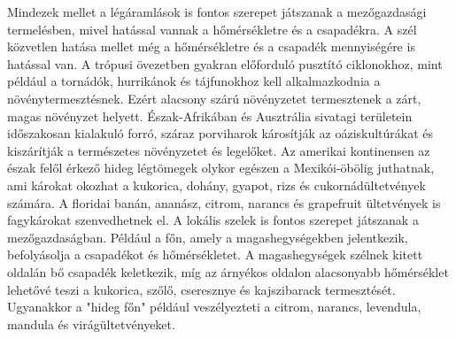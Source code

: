 \documentclass[a4paper,oneside,onecolumn,12pt]{LegrandOrangeBook}
\begin{document}
Mindezek mellet a légáramlások is fontos szerepet játszanak a mezőgazdasági termelésben, mivel hatással vannak a hőmérsékletre és a csapadékra. A szél közvetlen hatása mellet még a hőmérsékletre és a csapadék mennyiségére is hatással van. 
A trópusi övezetben gyakran előforduló pusztító ciklonokhoz, mint például a tornádók, hurrikánok és tájfunokhoz kell alkalmazkodnia a növénytermesztésnek. Ezért alacsony szárú növényzetet termesztenek a zárt, magas növényzet helyett.
	Észak-Afrikában és Ausztrália sivatagi területein időszakosan kialakuló forró, száraz porviharok károsítják az oáziskultúrákat és kiszárítják a természetes növényzetet és legelőket.
Az amerikai kontinensen az észak felől érkező hideg légtömegek olykor egészen a Mexikói-öbölig juthatnak, ami károkat okozhat a kukorica, dohány, gyapot, rizs és cukornádültetvények számára. A floridai banán, ananász, citrom, narancs és grapefruit ültetvények is fagykárokat szenvedhetnek el.
A lokális szelek is fontos szerepet játszanak a mezőgazdaságban. Például a főn, amely a magashegységekben jelentkezik, befolyásolja a csapadékot és hőmérsékletet. A magashegységek szélnek kitett oldalán bő csapadék keletkezik, míg az árnyékos oldalon alacsonyabb hőmérséklet lehetővé teszi a kukorica, szőlő, cseresznye és kajszibarack termesztését. Ugyanakkor a "hideg főn" például veszélyezteti a citrom, narancs, levendula, mandula és virágültetvényeket.
\end{document}
